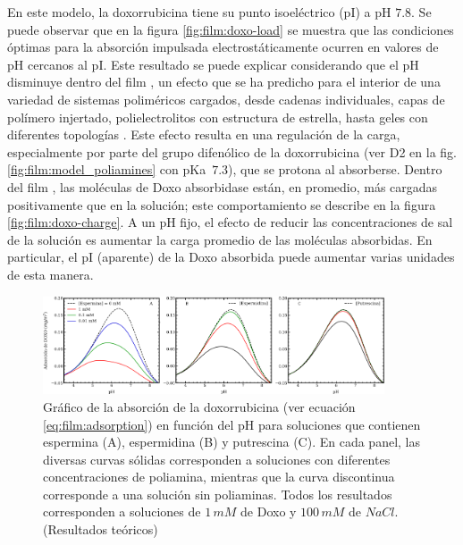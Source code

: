 En este modelo, la doxorrubicina tiene su punto isoel\'ectrico (pI) a pH $7.8$. Se puede observar que en  la figura  \ref{fig:film:doxo-load} se muestra que las condiciones \'optimas para la absorci\'on impulsada electrost\'aticamente ocurren en valores de pH cercanos al pI. Este resultado se puede explicar considerando que el pH disminuye dentro del film , un efecto que se ha predicho para el interior de una variedad de sistemas polim\'ericos cargados, desde cadenas individuales, capas de pol\'imero injertado, polielectrolitos con estructura de estrella, hasta geles con diferentes topolog\'ias  \cite{Nap2006,Borisov2011,Longo2011,Polotsky2013,Murmiliuk2018}. Este efecto resulta en una regulaci\'on de la carga, especialmente por parte del grupo difen\'olico de la doxorrubicina (ver D2 en la fig. \ref{fig:film:model_poliamines} con pKa~$7.3$), que se protona al absorberse. Dentro del film , las mol\'eculas de Doxo absorbidase est\'an, en promedio, m\'as cargadas positivamente que en la soluci\'on; este comportamiento se describe en la figura \ref{fig:film:doxo-charge}. A un pH fijo, el efecto de reducir las concentraciones de sal de la soluci\'on es aumentar la carga promedio de las mol\'eculas absorbidas. En particular, el pI (aparente) de la Doxo absorbida puede aumentar varias unidades de esta manera.

\begin{figure}[!htb]
	\centering
	\includegraphics[width=0.9\textwidth]{Figures/graph-film/doxo_release-amines.pdf}
	\caption{Gr\'afico de la absorci\'on de la doxorrubicina (ver ecuación \ref{eq:film:adsorption}) en funci\'on del pH para soluciones que contienen espermina (A), espermidina (B) y putrescina (C).
		En cada panel, las diversas curvas s\'olidas corresponden a soluciones con diferentes concentraciones de poliamina, mientras que la curva discontinua corresponde a una soluci\'on sin poliaminas. Todos los resultados corresponden a soluciones de $1\, mM$ de Doxo y $100\, mM$ de $NaCl$. (Resultados te\'oricos)}
	\label{fig:film:doxo-release}
\end{figure}




